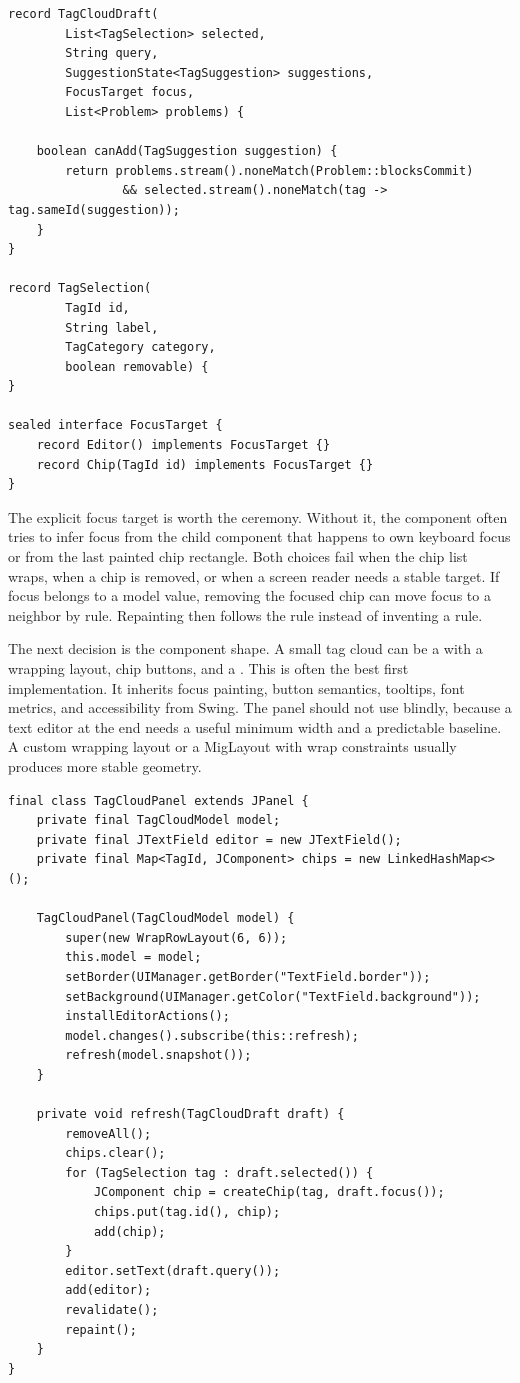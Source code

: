\begin{lstlisting}[caption={A tag cloud model separates identity, query, suggestions, and focus.}]
record TagCloudDraft(
        List<TagSelection> selected,
        String query,
        SuggestionState<TagSuggestion> suggestions,
        FocusTarget focus,
        List<Problem> problems) {

    boolean canAdd(TagSuggestion suggestion) {
        return problems.stream().noneMatch(Problem::blocksCommit)
                && selected.stream().noneMatch(tag -> tag.sameId(suggestion));
    }
}

record TagSelection(
        TagId id,
        String label,
        TagCategory category,
        boolean removable) {
}

sealed interface FocusTarget {
    record Editor() implements FocusTarget {}
    record Chip(TagId id) implements FocusTarget {}
}
\end{lstlisting}

The explicit focus target is worth the ceremony. Without it, the component often
tries to infer focus from the child component that happens to own keyboard focus
or from the last painted chip rectangle. Both choices fail when the chip list
wraps, when a chip is removed, or when a screen reader needs a stable target. If
focus belongs to a model value, removing the focused chip can move focus to a
neighbor by rule. Repainting then follows the rule instead of inventing a rule.

The next decision is the component shape. A small tag cloud can be a
 with a wrapping layout, chip buttons, and a .
This is often the best first implementation. It inherits focus painting, button
semantics, tooltips, font metrics, and accessibility from Swing. The panel
should not use  blindly, because a text editor at the end needs
a useful minimum width and a predictable baseline. A custom wrapping layout or a
MigLayout with wrap constraints usually produces more stable geometry.

\begin{lstlisting}[caption={A tag cloud can start as a panel of chip buttons plus an editor.}]
final class TagCloudPanel extends JPanel {
    private final TagCloudModel model;
    private final JTextField editor = new JTextField();
    private final Map<TagId, JComponent> chips = new LinkedHashMap<>();

    TagCloudPanel(TagCloudModel model) {
        super(new WrapRowLayout(6, 6));
        this.model = model;
        setBorder(UIManager.getBorder("TextField.border"));
        setBackground(UIManager.getColor("TextField.background"));
        installEditorActions();
        model.changes().subscribe(this::refresh);
        refresh(model.snapshot());
    }

    private void refresh(TagCloudDraft draft) {
        removeAll();
        chips.clear();
        for (TagSelection tag : draft.selected()) {
            JComponent chip = createChip(tag, draft.focus());
            chips.put(tag.id(), chip);
            add(chip);
        }
        editor.setText(draft.query());
        add(editor);
        revalidate();
        repaint();
    }
}
\end{lstlisting}


